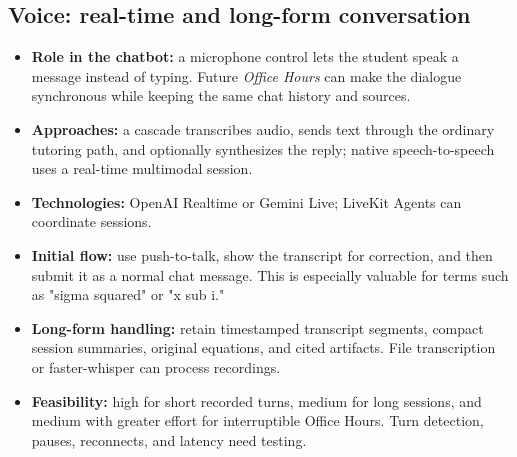 \documentclass[11pt]{article}
\begin{document}
\subsection{Voice: real-time and long-form conversation}
\begin{itemize}
\item \textbf{Role in the chatbot:} a microphone control lets the student speak a message instead of typing. Future \emph{Office Hours} can make the dialogue synchronous while keeping the same chat history and sources.
\item \textbf{Approaches:} a cascade transcribes audio, sends text through the ordinary tutoring path, and optionally synthesizes the reply; native speech-to-speech uses a real-time multimodal session.
\item \textbf{Technologies:} OpenAI Realtime or Gemini Live; LiveKit Agents can coordinate sessions.\cite{realtime,live,livekit}
\item \textbf{Initial flow:} use push-to-talk, show the transcript for correction, and then submit it as a normal chat message. This is especially valuable for terms such as "sigma squared" or "x sub i."
\item \textbf{Long-form handling:} retain timestamped transcript segments, compact session summaries, original equations, and cited artifacts. File transcription or faster-whisper can process recordings.\cite{stt,whisper}
\item \textbf{Feasibility:} high for short recorded turns, medium for long sessions, and medium with greater effort for interruptible Office Hours. Turn detection, pauses, reconnects, and latency need testing.
\end{itemize}
\end{document}
